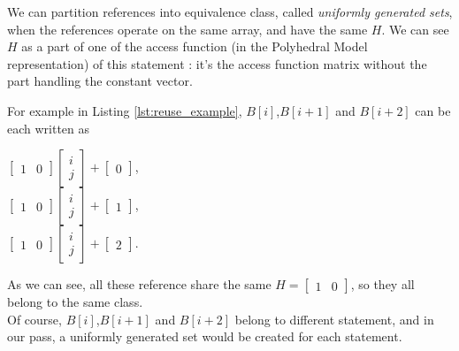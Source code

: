 \documentclass[paper=a4, fontsize=11.5pt]{scrartcl}
\numberwithin{equation}{section}        %
\numberwithin{figure}{section}          %
\numberwithin{table}{section}               %
\begin{document}
            We can partition references into equivalence class, called \textit{uniformly generated sets},
            when the references operate on the same array, and have the same $H$.
            We can see $H$ as a part of one of the access function (in the Polyhedral Model representation) of this statement :
            it's the access function matrix without the part handling the constant vector.

            For example in Listing \ref{lst:reuse_example}, $B[i]$,$B[i+1]$ and $B[i+2]$ can be each written as
            \begin{center}
                $
                \begin{bmatrix}
                    1 & 0
                \end{bmatrix}
                \begin{bmatrix}
                    i\\
                    j
                \end{bmatrix}
                +
                \begin{bmatrix}
                    0
                \end{bmatrix}
                $,\\
                $
                \begin{bmatrix}
                    1 & 0
                \end{bmatrix}
                \begin{bmatrix}
                    i\\
                    j
                \end{bmatrix}
                +
                \begin{bmatrix}
                    1
                \end{bmatrix}
                $,\\
                $
                \begin{bmatrix}
                    1 & 0
                \end{bmatrix}
                \begin{bmatrix}
                    i\\
                    j
                \end{bmatrix}
                +
                \begin{bmatrix}
                    2
                \end{bmatrix}
                $.
            \end{center}
            As we can see, all these reference share the same $H=\begin{bmatrix}1 & 0\end{bmatrix}$,
            so they all belong to the same class.\\
            Of course, $B[i]$,$B[i+1]$ and $B[i+2]$ belong to different statement, and in
            our pass, a uniformly generated set would be created for each statement.
\end{document}

